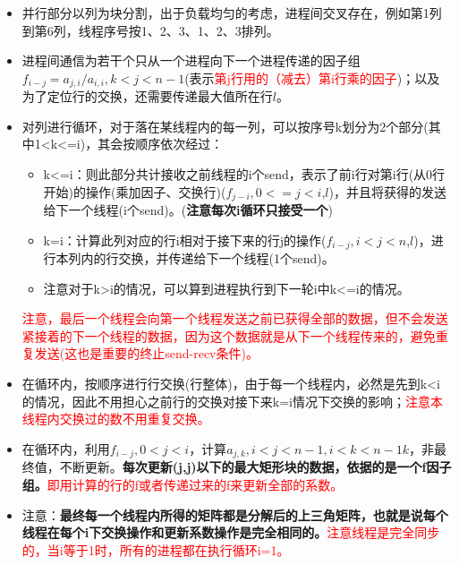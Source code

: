 \documentclass[UTF8]{article}%
\begin{document}
\begin{itemize}
    \item 并行部分以列为块分割，出于负载均匀的考虑，进程间交叉存在，例如第1列到第6列，线程序号按1、2、3、1、2、3排列。
    \item 进程间通信为若干个只从一个进程向下一个进程传递的因子组$f_{i-j}=a_{j,i}/a_{i,i},k<j<n-1$(表示\textcolor{red}{第j行用的（减去）第i行乘的因子})；以及为了定位行的交换，还需要传递最大值所在行$l$。
    \item 对列进行循环，对于落在某线程内的每一列，可以按序号k划分为2个部分(其中1<k<=i)，其会按顺序依次经过：
    
    {
        \begin{itemize}
            \item k<=i：则此部分共计接收之前线程的i个send，表示了前i行对第i行(从0行开始)的操作(乘加因子、交换行)($f_{j-i},0<=j<i$,$l$)，并且将获得的发送给下一个线程(i个send)。(\textbf{注意每次i循环只接受一个})
            \item k=i：计算此列对应的行i相对于接下来的行j的操作($f_{i-j},i<j<n$,$l$)，进行本列内的行交换，并传递给下一个线程(1个send)。
            \item 注意对于k>i的情况，可以算到进程执行到下一轮i中k<=i的情况。
        \end{itemize}
    }

    \textcolor{red}{注意，最后一个线程会向第一个线程发送之前已获得全部的数据，但不会发送紧接着的下一个线程的数据，因为这个数据就是从下一个线程传来的，避免重复发送(这也是重要的终止send-recv条件)。}


    \item 在循环内，按顺序进行行交换(行整体)，由于每一个线程内，必然是先到k<i的情况，因此不用担心之前行的交换对接下来k=i情况下交换的影响；\textcolor{red}{注意本线程内交换过的数不用重复交换。}
    \item 在循环内，利用$f_{i-j},0<j<i$，计算$a_{j,k},i<j<n-1,i<k<n-1k$，非最终值，不断更新。\textbf{每次更新(j,j)以下的最大矩形块的数据，依据的是一个f因子组。}\textcolor{red}{即用计算的行的f或者传递过来的f来更新全部的系数。}
    \item 注意：\textbf{最终每一个线程内所得的矩阵都是分解后的上三角矩阵，也就是说每个线程在每个i下交换操作和更新系数操作是完全相同的。}\textcolor{red}{注意线程是完全同步的，当i等于1时，所有的进程都在执行循环i=1。}
\end{itemize}
\end{document}
